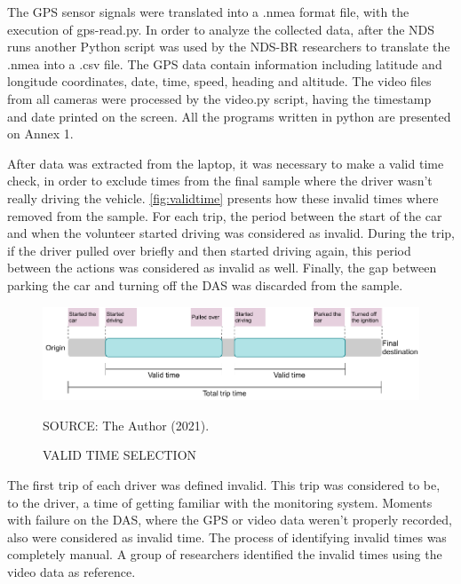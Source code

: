 The GPS sensor signals were translated into a .nmea format file, with the execution of gps-read.py. In order to analyze the collected data, after the NDS runs another Python script was used by the NDS-BR researchers to translate the .nmea into a .csv file. The GPS data contain information including latitude and longitude coordinates, date, time, speed, heading and altitude. The video files from all cameras were processed by the video.py script, having the timestamp and date printed on the screen. All the programs written in python are presented on Annex 1. 

After data was extracted from the laptop, it was necessary to make a valid time check, in order to exclude times from the final sample where the driver wasn't really driving the vehicle. \autoref{fig:validtime} presents how these invalid times where removed from the sample. For each trip, the period between the start of the car and when the volunteer started driving was considered as invalid. During the trip, if the driver pulled over briefly and then started driving again, this period between the actions was considered as invalid as well. Finally, the gap between parking the car and turning off the DAS was discarded from the sample.  

\begin{figure}[!htbp]
    \centering\footnotesize
    \captionsetup{font=footnotesize}
    \caption{VALID TIME SELECTION}
    \includegraphics{fig/validtime.pdf}
    \label{fig:validtime}
    \par SOURCE: The Author (2021).
\end{figure}

The first trip of each driver was defined invalid. This trip was considered to be, to the driver, a time of getting familiar with the monitoring system. Moments with failure on the DAS, where the GPS or video data weren't properly recorded, also were considered as invalid time. The process of identifying invalid times was completely manual. A group of researchers identified the invalid times using the video data as reference. 


